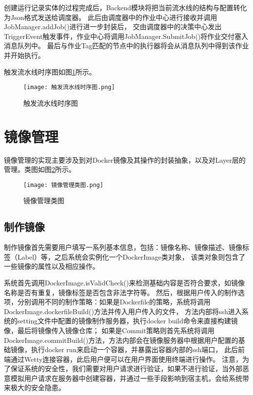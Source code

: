 创建运行记录实体的过程完成后，Backend模块将把当前流水线的结构与配置转化为Json格式发送给调度器。
此后由调度器中的作业中心进行接收并调用JobManager.addJob()进行进一步封装后，
交由调度器中的决策中心发出TriggerEvent触发事件，作业中心将调用JobManager.SubmitJob()将作业交付塞入消息队列中。
最后与作业Tag匹配的节点中的执行器将会从消息队列中得到该作业并开始执行。

触发流水线时序图如图\ref{fig:触发流水线时序图}所示。

\begin{figure}[h]
  \centering
  \texttt{[image: 触发流水线时序图.png]}
  \caption{触发流水线时序图}
  \label{fig:触发流水线时序图}
\end{figure}

\section{镜像管理}
镜像管理的实现主要涉及到对Docker镜像及其操作的封装抽象，以及对Layer层的管理。类图如图\ref{fig:镜像管理类图}所示。

\begin{figure}[h]
  \centering
  \texttt{[image: 镜像管理类图.png]}
  \caption{镜像管理类图}
  \label{fig:镜像管理类图}
\end{figure}

\subsection{制作镜像}
制作镜像首先需要用户填写一系列基本信息，包括：镜像名称、镜像描述、镜像标签（Label）等，之后系统会实例化一个DockerImage类对象，
该类对象则包含了一些镜像的属性以及相应操作。

系统首先调用DockerImage.isValidCheck()来检测基础内容是否符合要求，如镜像名称是否有重复，镜像标签是否包含非法字符等。
然后，根据用户传入的制作选项，分别调用不同的制作策略：如果是Dockerfile的策略，系统将调用DockerImage.dockerfileBuild()方法并传入用户传入的文件，
方法内部将ssh进入系统的setting文件中配置的镜像制作服务器，执行docker build命令来直接构建镜像，最后将镜像传入镜像仓库；
如果是Commit策略则首先系统将调用DockerImage.commitBuild()方法，方法内部会在镜像服务器中根据用户配置的基础镜像，执行docker run来启动一个容器，并暴露出容器内部的ssh端口，
此后前端通过Wetty连接容器，此后用户便可以在用户界面使用终端进行操作。
注意，为了保证系统的安全性，我们需要对用户请求进行验证，如果不进行验证，当外部恶意模拟用户请求在服务器中创建容器，并通过一些手段影响到宿主机，会给系统带来极大的安全隐患。

